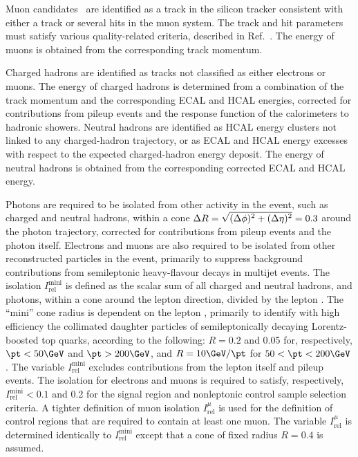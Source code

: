 Muon candidates~\cite{Chatrchyan:2012xi} are identified as a track in the
silicon tracker consistent with either a track or several hits in the
muon system. The track and hit parameters must satisfy various
quality-related criteria, described in Ref.~\cite{Chatrchyan:2012xi}.
The energy of muons is obtained from the corresponding track momentum.

Charged hadrons are identified as tracks not
classified as either electrons or muons.
The energy of charged hadrons is determined from a combination of the
track momentum and the corresponding ECAL and HCAL energies, corrected
for contributions from pileup events and the response function of the
calorimeters to hadronic showers. Neutral hadrons are identified as
HCAL energy clusters not linked to any charged-hadron trajectory, or
as ECAL and HCAL energy excesses with respect to the expected
charged-hadron energy deposit.  The energy of neutral hadrons is
obtained from the corresponding corrected ECAL and HCAL energy.

Photons are required to be isolated from other activity in the event,
such as charged and neutral hadrons, within a cone $\Delta R =
\sqrt{\smash[b]{(\Delta\phi)^2 + (\Delta\eta)^2}} = 0.3$ around the photon
trajectory, corrected for contributions from pileup events and the
photon itself. Electrons and muons are also required to be isolated
from other reconstructed particles in the event, primarily to suppress
background contributions from semileptonic heavy-flavour decays in
multijet events. The isolation $I^\text{mini}_\text{rel}$ is defined
as the scalar \pt sum of all charged and neutral hadrons, and photons,
within a cone around the lepton direction, divided by the lepton
\pt. The ``mini'' cone radius is dependent on the lepton \pt,
primarily to identify with high efficiency the collimated daughter
particles of semileptonically decaying Lorentz-boosted top quarks,
according to the following: $R = 0.2$ and 0.05 for, respectively, $\pt
< 50\GeV$ and $\pt > 200\GeV$, and $R = 10\GeV / \pt$ for $50 < \pt <
200\GeV$. The variable $I^\text{mini}_\text{rel}$ excludes
contributions from the lepton itself and pileup events. The isolation
for electrons and muons is required to satisfy, respectively,
$I^\text{mini}_\text{rel} < 0.1$ and 0.2 for the signal region and
nonleptonic control sample selection criteria.  A tighter definition
of muon isolation $I^{\mu}_\text{rel}$ is used for the definition of
control regions that are required to contain at least one muon. The
variable $I^{\mu}_\text{rel}$ is determined identically to
$I^\text{mini}_\text{rel}$ except that a cone of fixed radius $R =
0.4$ is assumed.

